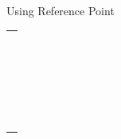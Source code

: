 \documentclass{article}
\begin{document}
\begin{multicols}{2}
    Using Reference Point

    \vspace{0.5cm}
    \begin{tabular}{|c|}
        \hline \hspace{2cm} \\ \hline \hspace{2cm} \\ \hline \hspace{2cm} \\ \hline \hspace{2cm} \\ \hline \hspace{2cm} \\ \hline \hspace{2cm} \\ \hline \hspace{2cm} \\ \hline \hspace{2cm} \\ \hline \hspace{2cm} \\ \hline \hspace{2cm} \\ \hline \hspace{2cm} \\ \hline \hspace{2cm} \\ \hline \hspace{2cm} \\ \hline \hspace{2cm} \\ \hline \hspace{2cm} \\ \hline \hspace{2cm} \\ \hline \hspace{2cm} \\ \hline \hspace{2cm} \\ \hline \hspace{2cm} \\ \hline \hspace{2cm} \\ \hline \hspace{2cm} \\ \hline \hspace{2cm} \\ \hline \hspace{2cm} \\ \hline \hspace{2cm} \\ \hline \hspace{2cm} \\ \hline
    \end{tabular}
\end{multicols}
\end{document}
